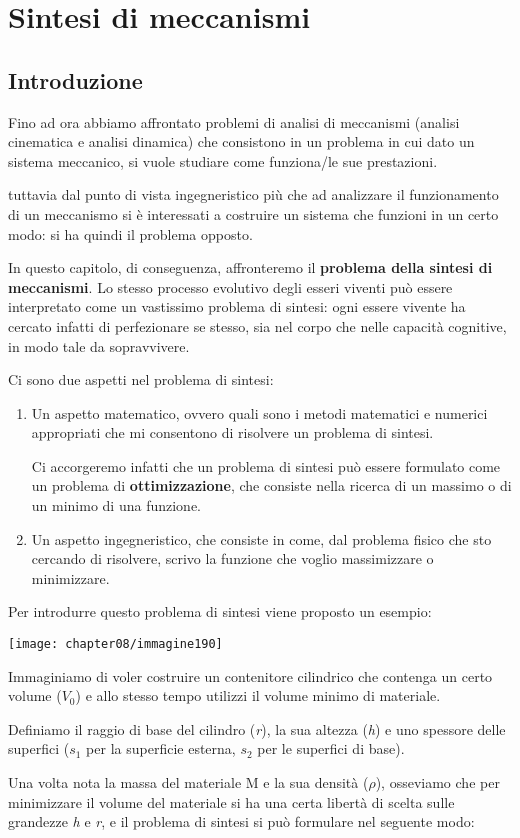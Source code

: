 \chapter{Sintesi di meccanismi}

\section{Introduzione}

Fino ad ora abbiamo affrontato problemi di analisi di meccanismi (analisi cinematica e analisi dinamica) che consistono in un problema in cui dato un sistema meccanico, si vuole studiare come funziona/le sue prestazioni.

tuttavia dal punto di vista ingegneristico più che ad analizzare il funzionamento di un meccanismo si è interessati a costruire un sistema che funzioni in un certo modo: si ha quindi il problema opposto.

In questo capitolo, di conseguenza, affronteremo il \textbf{problema della sintesi di meccanismi}. Lo stesso processo evolutivo degli esseri viventi può essere interpretato come un vastissimo problema di sintesi: ogni essere vivente ha cercato infatti di perfezionare se stesso, sia nel corpo che nelle capacità cognitive, in modo tale da sopravvivere.

Ci sono due aspetti nel problema di sintesi: 
\begin{enumerate}
\item Un aspetto matematico, ovvero quali sono i metodi matematici e numerici appropriati che mi consentono di risolvere un problema di sintesi.

Ci accorgeremo infatti che un problema di sintesi può essere formulato come un problema di \textbf{ottimizzazione}, che consiste nella ricerca di un massimo o di un minimo di una funzione.
\item Un aspetto ingegneristico, che consiste in come, dal problema fisico che sto cercando di risolvere, scrivo la funzione che voglio massimizzare o minimizzare.
\end{enumerate}

Per introdurre questo problema di sintesi viene proposto un esempio:

\begin{minipage}{.4\textwidth}
\centering
\texttt{[image: chapter08/immagine190]}
\end{minipage}
\hfill
\begin{minipage}{.55\textwidth}
Immaginiamo di voler costruire un contenitore cilindrico che contenga un certo volume ($V_0$) e allo stesso tempo utilizzi il volume minimo di materiale.

Definiamo il raggio di base del cilindro (\emph{r}), la sua altezza (\emph{h}) e uno spessore delle superfici ($s_1$ per la superficie esterna, $s_2$ per le superfici di base).

Una volta nota la massa del materiale M e la sua densità ($\rho$), osseviamo che per minimizzare il volume del materiale si ha una certa libertà di scelta sulle grandezze \emph{h} e \emph{r}, e il problema di sintesi si può formulare nel seguente modo:
\end{minipage}

